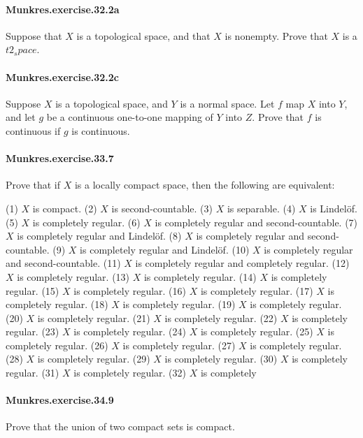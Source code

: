 \documentclass{article}
\begin{document}
\paragraph{Munkres.exercise.32.2a} Suppose that $X$ is a topological space, and that $X$ is nonempty. Prove that $X$ is a $t2_space$.

\paragraph{Munkres.exercise.32.2c} Suppose $X$ is a topological space, and $Y$ is a normal space. Let $f$ map $X$ into $Y$, and let $g$ be a continuous one-to-one mapping of $Y$ into $Z$. Prove that $f$ is continuous if $g$ is continuous.

\paragraph{Munkres.exercise.33.7} Prove that if $X$ is a locally compact space, then the following are equivalent:

(1) $X$ is compact.
(2) $X$ is second-countable.
(3) $X$ is separable.
(4) $X$ is Lindelöf.
(5) $X$ is completely regular.
(6) $X$ is completely regular and second-countable.
(7) $X$ is completely regular and Lindelöf.
(8) $X$ is completely regular and second-countable.
(9) $X$ is completely regular and Lindelöf.
(10) $X$ is completely regular and second-countable.
(11) $X$ is completely regular and completely regular.
(12) $X$ is completely regular.
(13) $X$ is completely regular.
(14) $X$ is completely regular.
(15) $X$ is completely regular.
(16) $X$ is completely regular.
(17) $X$ is completely regular.
(18) $X$ is completely regular.
(19) $X$ is completely regular.
(20) $X$ is completely regular.
(21) $X$ is completely regular.
(22) $X$ is completely regular.
(23) $X$ is completely regular.
(24) $X$ is completely regular.
(25) $X$ is completely regular.
(26) $X$ is completely regular.
(27) $X$ is completely regular.
(28) $X$ is completely regular.
(29) $X$ is completely regular.
(30) $X$ is completely regular.
(31) $X$ is completely regular.
(32) $X$ is completely

\paragraph{Munkres.exercise.34.9} Prove that the union of two compact sets is compact.

\end{document}

